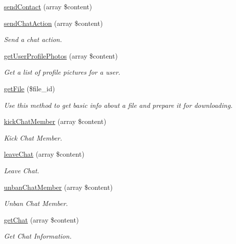 \begin{DoxyCompactItemize}
\hyperlink{class_telegram_a5ba4fd675a877d995bb0d7305aa56324}{send\-Contact} (array \$content)
\item 
\hyperlink{class_telegram_aa8c4c54f8f2fcbb53de050458fb176b7}{send\-Chat\-Action} (array \$content)
\begin{DoxyCompactList}\small\item\em Send a chat action. \end{DoxyCompactList}\item 
\hyperlink{class_telegram_af2245dc488830eb7add02c35e8dcf492}{get\-User\-Profile\-Photos} (array \$content)
\begin{DoxyCompactList}\small\item\em Get a list of profile pictures for a user. \end{DoxyCompactList}\item 
\hyperlink{class_telegram_acb201ffc034063cfd347962c49ad5ad9}{get\-File} (\$file\-\_\-id)
\begin{DoxyCompactList}\small\item\em Use this method to get basic info about a file and prepare it for downloading. \end{DoxyCompactList}\item 
\hyperlink{class_telegram_a165397f59469136d25b445a83b6fd13b}{kick\-Chat\-Member} (array \$content)
\begin{DoxyCompactList}\small\item\em Kick Chat Member. \end{DoxyCompactList}\item 
\hyperlink{class_telegram_ab5d2552e116deb2f9c3940f3e09b4e7a}{leave\-Chat} (array \$content)
\begin{DoxyCompactList}\small\item\em Leave Chat. \end{DoxyCompactList}\item 
\hyperlink{class_telegram_abb59232bb0fd79760521c8e81ea0f9b8}{unban\-Chat\-Member} (array \$content)
\begin{DoxyCompactList}\small\item\em Unban Chat Member. \end{DoxyCompactList}\item 
\hyperlink{class_telegram_a84b0d627829ac32122cf771094f3cffb}{get\-Chat} (array \$content)
\begin{DoxyCompactList}\small\item\em Get Chat Information. \end{DoxyCompactList}\item 

\end{DoxyCompactItemize}
